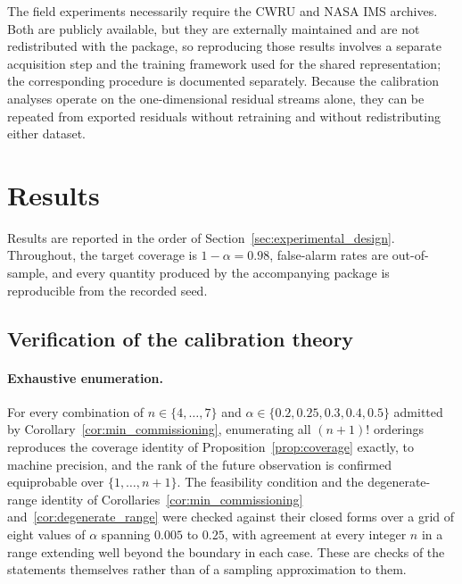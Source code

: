 \documentclass[a4paper]{cas-sc}
\begin{document}
The field experiments necessarily require the CWRU and NASA IMS archives.
Both are publicly available, but they are externally maintained and are not
redistributed with the package, so reproducing those results involves a
separate acquisition step and the training framework used for the shared
representation; the corresponding procedure is documented separately. Because
the calibration analyses operate on the one-dimensional residual streams
alone, they can be repeated from exported residuals without retraining and
without redistributing either dataset.

\section{Results}
\label{sec:results}

Results are reported in the order of
Section~\ref{sec:experimental_design}. Throughout, the target coverage is
\(1-\alpha=0.98\), false-alarm rates are out-of-sample, and every quantity
produced by the accompanying package is reproducible from the recorded seed.

\subsection{Verification of the calibration theory}
\label{subsec:results_verification}

\paragraph{Exhaustive enumeration.}
For every combination of \(n\in\{4,\ldots,7\}\) and
\(\alpha\in\{0.2,0.25,0.3,0.4,0.5\}\) admitted by
Corollary~\ref{cor:min_commissioning}, enumerating all \((n+1)!\) orderings
reproduces the coverage identity of Proposition~\ref{prop:coverage} exactly,
to machine precision, and the rank of the future observation is confirmed
equiprobable over \(\{1,\ldots,n+1\}\). The feasibility condition and the
degenerate-range identity of
Corollaries~\ref{cor:min_commissioning} and~\ref{cor:degenerate_range} were
checked against their closed forms over a grid of eight values of \(\alpha\)
spanning \(0.005\) to \(0.25\), with agreement at every integer \(n\) in a
range extending well beyond the boundary in each case. These are checks of the
statements themselves rather than of a sampling approximation to them.
\end{document}
